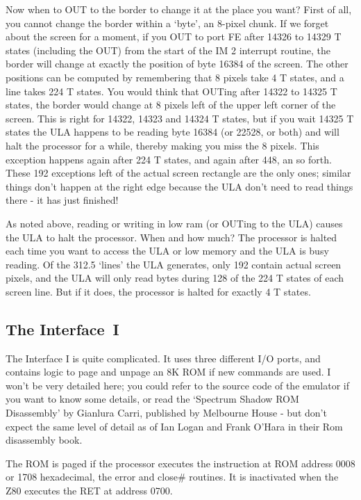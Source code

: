     Now when to OUT to the border to change it at the place you want? First
    of all, you cannot change the border within a `byte', an 8-pixel chunk.
    If we forget about the screen for a moment, if you OUT to port FE after
    14326 to 14329 T states (including the OUT) from the start of the IM 2
    interrupt routine, the border will change at exactly the position of
    byte 16384 of the screen.  The other positions can be computed by
    remembering that 8 pixels take 4 T states, and a line takes 224 T
    states.  You would think that OUTing after 14322 to 14325 T states, the
    border would change at 8 pixels left of the upper left corner of the
    screen.  This is right for 14322, 14323 and 14324 T states, but if you
    wait 14325 T states the ULA happens to be reading byte 16384 (or 22528,
    or both) and will halt the processor for a while, thereby making you
    miss the 8 pixels.  This exception happens again after 224 T states, and
    again after 448, an so forth.  These 192 exceptions left of the actual
    screen rectangle are the only ones; similar things don't happen at the
    right edge because the ULA don't need to read things there - it has just
    finished!

    As noted above, reading or writing in low ram (or OUTing to the ULA)
    causes the ULA to halt the processor.  When and how much? The processor
    is halted each time you want to access the ULA or low memory and the ULA
    is busy reading.  Of the 312.5 `lines' the ULA generates, only 192
    contain actual screen pixels, and the ULA will only read bytes during
    128 of the 224 T states of each screen line.  But if it does, the
    processor is halted for exactly 4 T states.



\subsection{The Interface~I}

    The Interface I is quite complicated.  It uses three different I/O
    ports, and contains logic to page and unpage an 8K ROM if new commands
    are used.  I won't be very detailed here; you could refer to the source
    code of the emulator if you want to know some details, or read the
    `Spectrum Shadow ROM Disassembly' by Gianlura Carri, published by
    Melbourne House - but don't expect the same level of detail as of Ian
    Logan and Frank O'Hara in their Rom disassembly book.

    The ROM is paged if the processor executes the instruction at ROM
    address 0008 or 1708 hexadecimal, the error and close\# routines.  It is
    inactivated when the Z80 executes the RET at address 0700.


